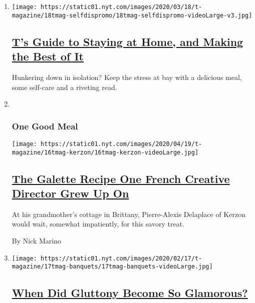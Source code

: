 \begin{enumerate}
\def\labelenumi{\arabic{enumi}.}
\item
  \texttt{[image: https://static01.nyt.com/images/2020/03/18/t-magazine/18tmag-selfdispromo/18tmag-selfdispromo-videoLarge-v3.jpg]}

  \hypertarget{ts-guide-to-staying-at-home-and-making-the-best-of-it}{%
  \subsection{\texorpdfstring{\href{/2020/03/19/t-magazine/stay-at-home-coronavirus-ideas.html}{T's
  Guide to Staying at Home, and Making the Best of
  It}}{T's Guide to Staying at Home, and Making the Best of It}}\label{ts-guide-to-staying-at-home-and-making-the-best-of-it}}

  Hunkering down in isolation? Keep the stress at bay with a delicious
  meal, some self-care and a riveting read.
\item ~
  \hypertarget{one-good-meal-4}{%
  \subsubsection{One Good Meal}\label{one-good-meal-4}}

  \texttt{[image: https://static01.nyt.com/images/2020/04/19/t-magazine/16tmag-kerzon/16tmag-kerzon-videoLarge.jpg]}

  \hypertarget{the-galette-recipe-one-french-creative-director-grew-up-on}{%
  \subsection{\texorpdfstring{\href{/2020/04/16/t-magazine/galette-recipe-pierre-alexis-delaplace.html}{The
  Galette Recipe One French Creative Director Grew Up
  On}}{The Galette Recipe One French Creative Director Grew Up On}}\label{the-galette-recipe-one-french-creative-director-grew-up-on}}

  At his grandmother's cottage in Brittany, Pierre-Alexis Delaplace of
  Kerzon would wait, somewhat impatiently, for this savory treat.

  By Nick Marino
\item
  \texttt{[image: https://static01.nyt.com/images/2020/02/17/t-magazine/17tmag-banquets/17tmag-banquets-videoLarge.jpg]}

  \hypertarget{when-did-gluttony-become-so-glamorous}{%
  \subsection{\texorpdfstring{\href{/2020/02/21/t-magazine/fashion-banquets.html}{When
  Did Gluttony Become So
  Glamorous?}}{When Did Gluttony Become So Glamorous?}}\label{when-did-gluttony-become-so-glamorous}}


\end{enumerate}

